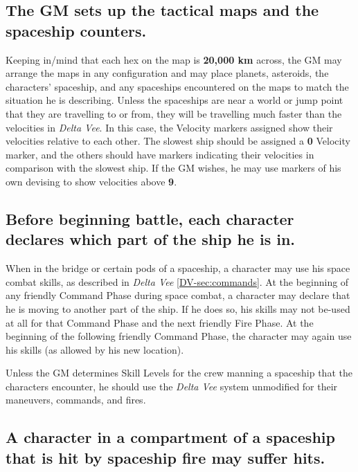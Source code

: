 \subsection[Tactical Maps]{The GM sets up the tactical maps and the spaceship
  counters.}
\label{sec:tactical-maps}



Keeping in/mind that each hex on the map is \textbf{20,000 km} across,
the GM may arrange the maps in any configuration and may place
planets, asteroids, the characters' spaceship, and any spaceships
encountered on the maps to match the situation he is describing.
Unless the spaceships are near a world or jump point that they are
travelling to or from, they will be travelling much faster than the
velocities in \emph{Delta Vee}. In this case, the Velocity markers
assigned show their velocities relative to each other. The slowest
ship should be assigned a \textbf{0} Velocity marker, and the others
should have markers indicating their velocities in comparison with the
slowest ship. If the GM wishes, he may use markers of his own devising
to show velocities above \textbf{9}.

\subsection[Character Positions]{Before beginning battle, each
  character declares which 
  part of the ship he is in.}
\label{sec:character-positions}



When in the bridge or certain pods of a spaceship, a character may use
his space combat skills, as described in \emph{Delta Vee}
\ref{DV-sec:commands}.  At the
beginning of any friendly Command Phase during space combat, a
character may declare that he is moving to another part of the ship.
If he does so, his skills may not be-used at all for that Command
Phase and the next friendly Fire Phase. At the beginning of the
following friendly Command Phase, the character may again use his
skills (as allowed by his new location).

Unless the GM determines Skill Levels for the crew manning a spaceship
that the characters encounter, he should use the \emph{Delta Vee}
system unmodified for their maneuvers, commands, and fires.


\subsection[Spacecraft Hits]{A character in a compartment of a
  spaceship that is hit by 
  spaceship fire may suffer hits.}
\label{sec:spacecraft-hits-player}



